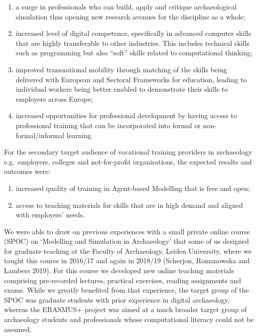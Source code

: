 \documentclass[
]{article}
\begin{document}
\begin{enumerate}
\def\labelenumi{\arabic{enumi}.}
\item
  a surge in professionals who can build, apply and critique archaeological simulation thus opening new research avenues for the discipline as a whole;
\item
  increased level of digital competence, specifically in advanced computer skills that are highly transferable to other industries. This includes technical skills such as programming but also ``soft'' skills related to computational thinking;
\item
  improved transnational mobility through matching of the skills being delivered with European and Sectoral Frameworks for education, leading to individual workers being better enabled to demonstrate their skills to employers across Europe;
\item
  increased opportunities for professional development by having access to professional training that can be incorporated into formal or non-formal/informal learning.
\end{enumerate}

For the secondary target audience of vocational training providers in archaeology e.g.~employers, colleges and not-for-profit organisations, the expected results and outcomes were:

\begin{enumerate}
\def\labelenumi{\arabic{enumi}.}
\item
  increased quality of training in Agent-based Modelling that is free and open;
\item
  access to teaching materials for skills that are in high demand and aligned with employers' needs.
\end{enumerate}

We were able to draw on previous experiences with a small private online course (SPOC) on `Modelling and Simulation in Archaeology' that some of us designed for graduate teaching at the Faculty of Archaeology, Leiden University, where we taught this course in 2016/17 and again in 2018/19 (Scherjon, Romanowska and Lambers 2019). For this course we developed new online teaching materials comprising pre-recorded lectures, practical exercises, reading assignments and exams. While we greatly benefited from that experience, the target group of the SPOC was graduate students with prior experience in digital archaeology, whereas the ERASMUS+ project was aimed at a much broader target group of archaeology students and professionals whose computational literacy could not be assumed.
\end{document}
